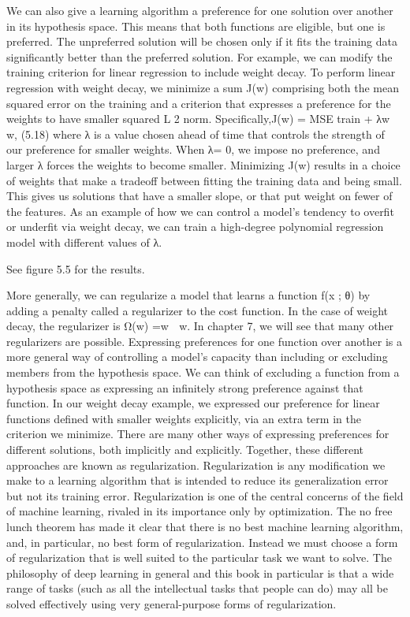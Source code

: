 \documentclass[11pt]{article}
\begin{document}
We can also give a learning algorithm a preference for one solution over another in its hypothesis space.
This means that both functions are eligible, but one is preferred.
The unpreferred solution will be chosen only if it ﬁts the training data signiﬁcantly better than the preferred solution.
For example, we can modify the training criterion for linear regression to include weight decay.
To perform linear regression with weight decay, we minimize a sum J(w) comprising both the mean squared error on the training and a criterion that expresses a preference for the weights to have smaller squared L 2 norm.
Speciﬁcally,J(w) = MSE train + λw  w, (5.18) where λ is a value chosen ahead of time that controls the strength of our preference for smaller weights.
When λ= 0, we impose no preference, and larger λ forces the weights to become smaller.
Minimizing J(w) results in a choice of weights that make a tradeoﬀ between ﬁtting the training data and being small.
This gives us solutions that have a smaller slope, or that put weight on fewer of the features.
As an example of how we can control a model’s tendency to overﬁt or underﬁt via weight decay, we can train a high-degree polynomial regression model with diﬀerent values of λ.

See ﬁgure 5.5 for the results.

More generally, we can regularize a model that learns a function f(x ; θ) by adding a penalty called a regularizer to the cost function.
In the case of weight decay, the regularizer is Ω(w) =w  w.
In chapter 7, we will see that many other regularizers are possible.
Expressing preferences for one function over another is a more general way of controlling a model’s capacity than including or excluding members from the hypothesis space.
We can think of excluding a function from a hypothesis space as expressing an inﬁnitely strong preference against that function.
In our weight decay example, we expressed our preference for linear functions deﬁned with smaller weights explicitly, via an extra term in the criterion we minimize.
There are many other ways of expressing preferences for diﬀerent solutions, both implicitly and explicitly.
Together, these diﬀerent approaches are known as regularization.
Regularization is any modiﬁcation we make to a learning algorithm that is intended to reduce its generalization error but not its training error.
Regularization is one of the central concerns of the ﬁeld of machine learning, rivaled in its importance only by optimization.
The no free lunch theorem has made it clear that there is no best machine learning algorithm, and, in particular, no best form of regularization.
Instead we must choose a form of regularization that is well suited to the particular task we want to solve.
The philosophy of deep learning in general and this book in particular is that a wide range of tasks (such as all the intellectual tasks that people can do) may all be solved eﬀectively using very general-purpose forms of regularization.
\end{document}
